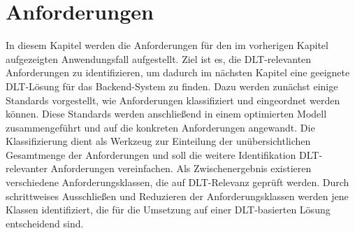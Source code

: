 \chapter{Anforderungen}
\label{ch:requirements}
In diesem Kapitel werden die Anforderungen für den im vorherigen Kapitel aufgezeigten Anwendungsfall aufgestellt. Ziel ist es, die \ac{DLT}-relevanten Anforderungen zu identifizieren, um dadurch im nächsten Kapitel eine geeignete \ac{DLT}-Lösung für das Backend-System zu finden. Dazu werden zunächst einige Standards vorgestellt, wie Anforderungen klassifiziert und eingeordnet werden können. Diese Standards werden anschließend in einem optimierten Modell zusammengeführt und auf die konkreten Anforderungen angewandt. Die Klassifizierung dient als Werkzeug zur Einteilung der unübersichtlichen Gesamtmenge der Anforderungen und soll die weitere Identifikation \ac{DLT}-relevanter Anforderungen vereinfachen. Als Zwischenergebnis existieren verschiedene Anforderungsklassen, die auf \ac{DLT}-Relevanz geprüft werden. Durch schrittweises Ausschließen und Reduzieren der Anforderungsklassen werden jene Klassen identifiziert, die für die Umsetzung auf einer \ac{DLT}-basierten Lösung entscheidend sind.

%
%
